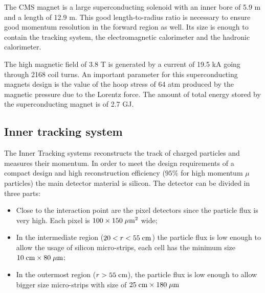 The CMS magnet is a large superconducting solenoid with an inner bore of 5.9 m and a length of 12.9 m.  This good length-to-radius ratio is necessary to ensure good momentum resolution in the forward region as well. Its size is enough to contain the tracking system, the electromagnetic calorimeter and the hadronic calorimeter. 

The high magnetic field of $3.8$ T is generated by a current of 19.5 kA going through 2168 coil turns. An important parameter for this superconducting magnets design is the value of the hoop stress of 64 atm produced by the magnetic pressure due to the Lorentz force. The amount of total energy stored by the superconducting magnet is of 2.7 GJ.

		

\clearpage

\subsection{Inner tracking system}

The Inner Tracking systems reconstructs the track of charged particles and measures their momentum. In order to meet the design requirements of a compact design and high reconstruction efficiency ($95\%$ for high momentum $\mu$ particles) the main detector material is silicon.
The detector can be divided in three parts:
\begin{itemize}
	\item Close to the interaction point are the pixel detectors since the particle flux is very high. Each pixel is $100\times150\;\mu\text{m}^{2}$ wide;
	\item In the intermediate region ($20 < r < 55\;\text{cm}$) the particle flux is low enough to allow the usage of silicon micro-strips, each cell has the minimum size $10\;\text{cm} \times 80\;\mu\text{m}$;
	\item In the outermost region ($r > 55\;\text{cm}$), the particle flux is low enough to allow bigger size micro-strips with size of $25\;\text{cm} \times 180 \;\mu\text{m}$ 
\end{itemize}

